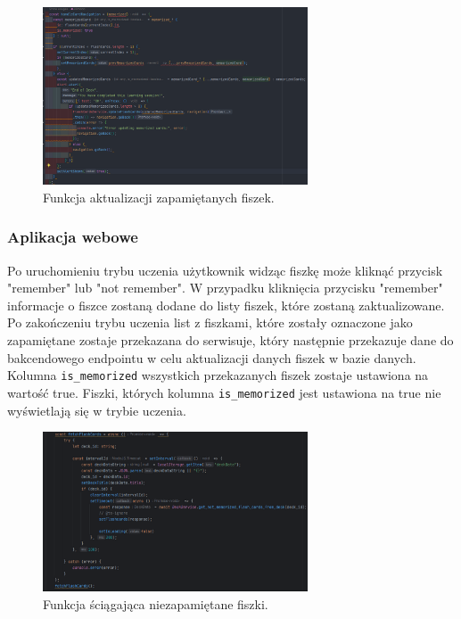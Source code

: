 \begin{figure}[H]
    \centering
    \includegraphics[width=0.7\textwidth]{chapters/chapter_8/screens/update_unmemorized_flash_cards_mobile}
    \caption{Funkcja aktualizacji zapamiętanych fiszek.}
    \label{img:update_unmemorized_flash_cards_mobile}
\end{figure}

\subsubsection{Aplikacja webowe}

Po uruchomieniu trybu uczenia użytkownik widząc fiszkę może kliknąć przycisk "remember" lub "not remember". W przypadku kliknięcia przycisku "remember" informacje o fiszce zostaną dodane do listy fiszek, które zostaną zaktualizowane. Po zakończeniu trybu uczenia list z fiszkami, które zostały oznaczone jako zapamiętane zostaje przekazana do serwisuje, który następnie przekazuje dane do bakcendowego endpointu w celu aktualizacji danych fiszek w bazie danych. Kolumna \texttt{is\_memorized} wszystkich przekazanych fiszek zostaje ustawiona na wartość true. Fiszki, których kolumna \texttt{is\_memorized} jest ustawiona na true nie wyświetlają się w trybie uczenia.

\begin{figure}[H]
    \centering
    \includegraphics[width=0.7\textwidth]{chapters/chapter_8/screens/get_unmemorized_flash_cards_web}
    \caption{Funkcja ściągająca niezapamiętane fiszki.}
    \label{img:get_unmemorized_flash_cards_web}
\end{figure}

